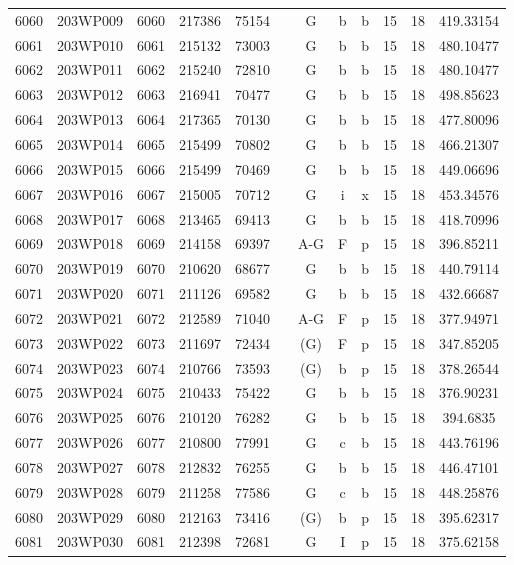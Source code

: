 \begin{tabular}{|*{12}{c|}}
6060 & 203WP009 & 6060 & 217386 & 75154 &  & G & b & b & 15 & 18 & 419.33154 \\ 
6061 & 203WP010 & 6061 & 215132 & 73003 &  & G & b & b & 15 & 18 & 480.10477 \\ 
6062 & 203WP011 & 6062 & 215240 & 72810 &  & G & b & b & 15 & 18 & 480.10477 \\ 
6063 & 203WP012 & 6063 & 216941 & 70477 &  & G & b & b & 15 & 18 & 498.85623 \\ 
6064 & 203WP013 & 6064 & 217365 & 70130 &  & G & b & b & 15 & 18 & 477.80096 \\ 
6065 & 203WP014 & 6065 & 215499 & 70802 &  & G & b & b & 15 & 18 & 466.21307 \\ 
6066 & 203WP015 & 6066 & 215499 & 70469 &  & G & b & b & 15 & 18 & 449.06696 \\ 
6067 & 203WP016 & 6067 & 215005 & 70712 &  & G & i & x & 15 & 18 & 453.34576 \\ 
6068 & 203WP017 & 6068 & 213465 & 69413 &  & G & b & b & 15 & 18 & 418.70996 \\ 
6069 & 203WP018 & 6069 & 214158 & 69397 &  & A-G & F & p & 15 & 18 & 396.85211 \\ 
6070 & 203WP019 & 6070 & 210620 & 68677 &  & G & b & b & 15 & 18 & 440.79114 \\ 
6071 & 203WP020 & 6071 & 211126 & 69582 &  & G & b & b & 15 & 18 & 432.66687 \\ 
6072 & 203WP021 & 6072 & 212589 & 71040 &  & A-G & F & p & 15 & 18 & 377.94971 \\ 
6073 & 203WP022 & 6073 & 211697 & 72434 &  & (G) & F & p & 15 & 18 & 347.85205 \\ 
6074 & 203WP023 & 6074 & 210766 & 73593 &  & (G) & b & p & 15 & 18 & 378.26544 \\ 
6075 & 203WP024 & 6075 & 210433 & 75422 &  & G & b & b & 15 & 18 & 376.90231 \\ 
6076 & 203WP025 & 6076 & 210120 & 76282 &  & G & b & b & 15 & 18 & 394.6835 \\ 
6077 & 203WP026 & 6077 & 210800 & 77991 &  & G & c & b & 15 & 18 & 443.76196 \\ 
6078 & 203WP027 & 6078 & 212832 & 76255 &  & G & b & b & 15 & 18 & 446.47101 \\ 
6079 & 203WP028 & 6079 & 211258 & 77586 &  & G & c & b & 15 & 18 & 448.25876 \\ 
6080 & 203WP029 & 6080 & 212163 & 73416 &  & (G) & b & p & 15 & 18 & 395.62317 \\ 
6081 & 203WP030 & 6081 & 212398 & 72681 &  & G & I & p & 15 & 18 & 375.62158 \\ 

\end{tabular}
